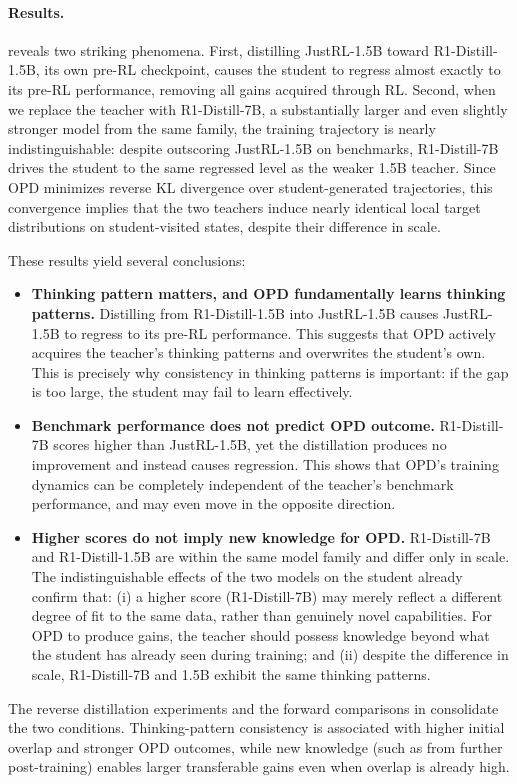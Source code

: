 \paragraph{Results.}
 reveals two striking phenomena.
First, distilling JustRL-1.5B toward R1-Distill-1.5B, its own pre-RL checkpoint, causes the student to regress almost exactly to its pre-RL performance, removing all gains acquired through RL.
Second, when we replace the teacher with R1-Distill-7B, a substantially larger and even slightly stronger model from the same family, the training trajectory is nearly indistinguishable: despite outscoring JustRL-1.5B on benchmarks, R1-Distill-7B drives the student to the same regressed level as the weaker 1.5B teacher.
Since OPD minimizes reverse KL divergence over student-generated trajectories, this convergence implies that the two teachers induce nearly identical local target distributions on student-visited states, despite their difference in scale.

These results yield several conclusions:
\begin{itemize}[leftmargin=12pt]
    \item \textbf{Thinking pattern matters, and OPD fundamentally learns thinking patterns.}
    Distilling from R1-Distill-1.5B into JustRL-1.5B causes JustRL-1.5B to regress to its pre-RL performance.
    This suggests that OPD actively acquires the teacher’s thinking patterns and overwrites the student's own. This is precisely why consistency in thinking patterns is important: if the gap is too large, the student may fail to learn effectively.
    
    \item \textbf{Benchmark performance does not predict OPD outcome.} R1-Distill-7B scores higher than JustRL-1.5B, yet the distillation produces no improvement and instead causes regression. This shows that OPD’s training dynamics can be completely independent of the teacher’s benchmark performance, and may even move in the opposite direction.
    
    \item \textbf{Higher scores do not imply new knowledge for OPD.} R1-Distill-7B and R1-Distill-1.5B are within the same model family and differ only in scale. The indistinguishable effects of the two models on the student already confirm that: (i) a higher score (R1-Distill-7B) may merely reflect a different degree of fit to the same data, rather than genuinely novel capabilities. For OPD to produce gains, the teacher should possess knowledge beyond what the student has already seen during training; and (ii) despite the difference in scale, R1-Distill-7B and 1.5B exhibit the same thinking patterns.

\end{itemize}


The reverse distillation experiments and the forward comparisons in  consolidate the two conditions.
Thinking-pattern consistency is associated with higher initial overlap and stronger OPD outcomes, while new knowledge (such as from further post-training) enables larger transferable gains even when overlap is already high.
